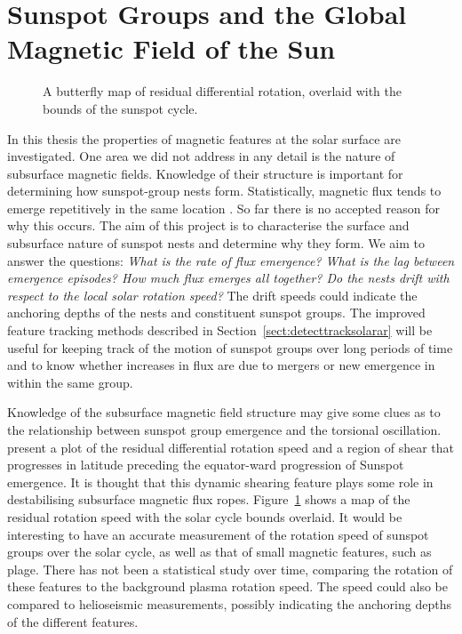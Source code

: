 \section{Sunspot Groups and the Global Magnetic Field of the Sun}

\begin{figure}[!t]
\caption[A butterfly map of residual differential rotation.]{A butterfly map of residual differential rotation, overlaid with the bounds of the sunspot cycle.}
\label{fig:torsosc}
\end{figure}

In this thesis the properties of magnetic features at the solar surface are investigated. One area we did not address in any detail is the nature of subsurface magnetic fields. Knowledge of their structure is important for determining how sunspot-group nests form. Statistically, magnetic flux tends to emerge repetitively in the same location \citep{Pojoga:2002}. So far there is no accepted reason for why this occurs. The aim of this project is to characterise the surface and subsurface nature of sunspot nests and determine why they form. We aim to answer the questions: \emph{What is the rate of flux emergence? What is the lag between emergence episodes? How much flux emerges all together? Do the nests drift with respect to the local solar rotation speed?} The drift speeds could indicate the anchoring depths of the nests and constituent sunspot groups. The improved feature tracking methods described in Section~\ref{sect:detecttracksolarar} will be useful for keeping track of the motion of sunspot groups over long periods of time and to know whether increases in flux are due to mergers or new emergence in within the same group.

Knowledge of the subsurface magnetic field structure may give some clues as to the relationship between sunspot group emergence and the torsional oscillation. \citet{Hathaway:2011} present a plot of the residual differential rotation speed and a region of shear that progresses in latitude preceding the equator-ward progression of Sunspot emergence. It is thought that this dynamic shearing feature plays some role in destabilising subsurface magnetic flux ropes. Figure~\ref{fig:torsosc} shows a map of the residual rotation speed with the solar cycle bounds overlaid. It would be interesting to have an accurate measurement of the rotation speed of sunspot groups over the solar cycle, as well as that of small magnetic features, such as plage. There has not been a statistical study over time, comparing the rotation of these features to the background plasma rotation speed. The speed could also be compared to helioseismic measurements, possibly indicating the anchoring depths of the different features.

